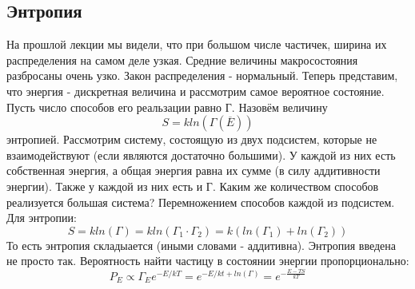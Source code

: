\documentclass[a4paper, 12pt]{article}
\begin{document}
	\subsection{Энтропия}
	На прошлой лекции мы видели, что при большом числе частичек, ширина их распределения на самом деле узкая. Средние величины макросостояния разбросаны очень узко. Закон распределения - нормальный. Теперь представим, что энергия - дискретная величина и рассмотрим самое вероятное состояние. Пусть число способов его реальзации равно Г. Назовём величину 
	\begin{equation*}
		S = k ln(\Gamma(\overline{E}))
	\end{equation*}
	энтропией. Рассмотрим систему, состоящую из двух подсистем, которые не взаимодействуют (если являются достаточно большими). У каждой из них есть собственная энергия, а общая энергия равна их сумме (в силу аддитивности энергии). Также у каждой из них есть и Г. Каким же количеством способов реализуется большая система? Перемножением способов каждой из подсистем. Для энтропии:
	\begin{equation*}
		S = kln(\Gamma) =  kln(\Gamma_{1} \cdot \Gamma_{2}) = k(ln(\Gamma_{1}) + ln(\Gamma_{2}))
	\end{equation*}
	То есть энтропия складыается (иными словами - аддитивна). Энтропия введена не просто так.  Вероятность найти частицу в состоянии энергии пропорционально:
	\begin{equation*}
		P_{E} \propto \Gamma_{E} e^{-E/kT} = e^{-E/kt + ln(\Gamma)} = e^{-\frac{E - TS}{kT}}
	\end{equation*}
\end{document}
